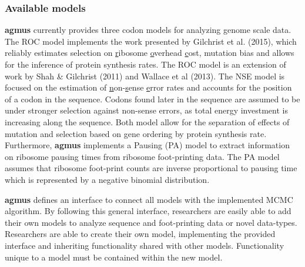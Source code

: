 \documentclass{bioinfo}
\newcommand{\package}{\textbf{agmus }} %
\begin{document}
\subsubsection*{Available models}
\package currently provides three codon models for analyzing genome scale data.
The ROC model implements the work presented by Gilchrist et al. (2015), which reliably estimates selection on \underline{r}ibosome \underline{o}verhead \underline{c}ost, mutation bias and allows for the inference of protein synthesis rates. The ROC model is an extension of work by Shah \& Gilchrist (2011) and  Wallace et al (2013). 
The NSE model is focused on the estimation of \underline{n}on-\underline{s}ense \underline{e}rror rates and accounts for the position of a codon in the sequence. Codons found later in the sequence are assumed to be under stronger selection against non-sense errors, as total energy investment is increasing along the sequence.
Both model allow for the separation of effects of mutation and selection based on gene ordering by protein synthesis rate.
Furthermore, \package implements a Pausing (PA) model to extract information on ribosome pausing times from ribosome foot-printing data. The PA model assumes that ribosome foot-print counts are inverse proportional to pausing time which is represented by a negative binomial distribution. 


\package defines an interface to connect all models with the implemented MCMC algorithm. 
By following this general interface, researchers are easily able to add their own models to analyze sequence and foot-printing data or novel data-types.
Researchers are able to create their own model, implementing the provided interface and inheriting functionality shared with other models.
Functionality unique to a model must be contained within the new model. 
\end{document}
